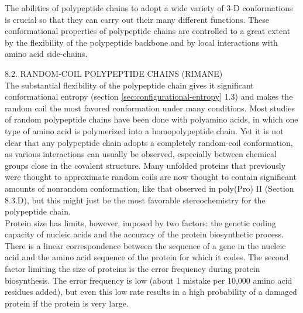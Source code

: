 The abilities of polypeptide chains to adopt a wide variety of 3-D conformations is crucial so that they
can carry out their many different functions. These conformational properties of polypeptide chains are controlled to a great extent by the flexibility of the polypeptide backbone and by local interactions with amino acid side-chains.

8.2. RANDOM-COIL POLYPEPTIDE CHAINS (RIMANE)\\
The substantial flexibility of the polypeptide chain gives it significant conformational entropy (section \ref{sec:configurational-entropy}
1.3) and makes the random coil the most favored conformation under many conditions. Most studies of random polypeptide chains have been done with polyamino acids, in which one type of amino acid is polymerized into a homopolypeptide chain. Yet it is not clear that any polypeptide chain adopts a completely random-coil conformation, as various interactions can usually be observed, especially between chemical groups close in the covalent structure. Many unfolded proteins that previously were thought to approximate random coils are now thought to contain significant amounts of nonrandom conformation, like that observed in poly(Pro) II (Section 8.3.D), but this might just be the most favorable stereochemistry for the polypeptide chain.
\cite{creighton2010biophysical}\\


Protein size has limits, however, imposed by two factors: the genetic coding capacity of nucleic acids and the accuracy of the protein biosynthetic process. 
There is a linear correspondence between the sequence of a gene in the nucleic acid and the amino acid sequence of the protein for which it codes.
The second factor limiting the size of proteins is the error frequency during protein biosynthesis. The error frequency is low (about 1 mistake per 10,000 amino acid residues added), but even this low rate results in a high probability of a damaged protein if the protein is very large. 

